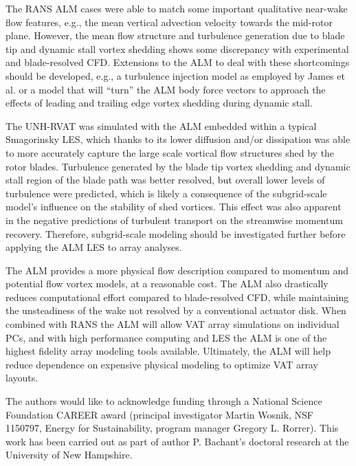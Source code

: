 \documentclass[times]{weauth}
\begin{document}
The RANS ALM cases were able to match some important qualitative near-wake flow
features, e.g., the mean vertical advection velocity towards the mid-rotor
plane. However, the mean flow structure and turbulence generation due to blade
tip and dynamic stall vortex shedding shows some discrepancy with experimental
and blade-resolved CFD. Extensions to the ALM to deal with these shortcomings
should be developed, e.g., a turbulence injection model as employed by James et
al. \cite{James2010} or a model that will ``turn'' the ALM body force vectors to
approach the effects of leading and trailing edge vortex shedding during dynamic
stall.

The UNH-RVAT was simulated with the ALM embedded within a typical Smagorinsky
LES, which thanks to its lower diffusion and/or dissipation was able to more
accurately capture the large scale vortical flow structures shed by the rotor
blades. Turbulence generated by the blade tip vortex shedding and dynamic stall
region of the blade path was better resolved, but overall lower levels of
turbulence were predicted, which is likely a consequence of the subgrid-scale
model's influence on the stability of shed vortices. This effect was also
apparent in the negative predictions of turbulent transport on the streamwise
momentum recovery. Therefore, subgrid-scale modeling should be investigated
further before applying the ALM LES to array analyses.

The ALM provides a more physical flow description compared to momentum and
potential flow vortex models, at a reasonable cost. The ALM also drastically
reduces computational effort compared to blade-resolved CFD, while maintaining
the unsteadiness of the wake not resolved by a conventional actuator disk. When
combined with RANS the ALM will allow VAT array simulations on individual PCs,
and with high performance computing and LES the ALM is one of the highest
fidelity array modeling tools available. Ultimately, the ALM will help reduce
dependence on expensive physical modeling to optimize VAT array layouts.


\acks The authors would like to acknowledge funding through a National Science
Foundation CAREER award (principal investigator Martin Wosnik, NSF 1150797,
Energy for Sustainability, program manager Gregory L. Rorrer). This work has
been carried out as part of author P. Bachant's doctoral research at the
University of New Hampshire.



\end{document}
